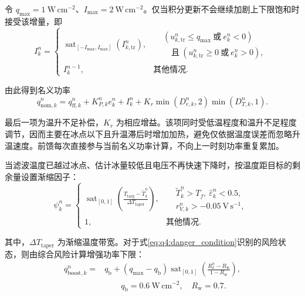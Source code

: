 \documentclass[bwprint]{gmcmthesis}
\numberwithin{equation}{section}
\numberwithin{figure}{section}
\begin{document}
令 $q_{\max}=1\ \mathrm{W\,cm^{-2}}$、$I_{\max}=2\ \mathrm{W\,cm^{-2}}$。仅当积分更新不会继续加剧上下限饱和时接受该增量，即
\begin{equation}
I_k^n=\begin{cases}
\operatorname{sat}_{[-I_{\max},I_{\max}]}(I_{k,\mathrm{tr}}^n),
& \begin{aligned}
&(u_{k,\mathrm{tr}}^n\leq q_{\max}\ \text{或}\ e_k^n<0)\\[-2pt]
&\quad\text{且}\ (u_{k,\mathrm{tr}}^n\geq0\ \text{或}\ e_k^n>0),
\end{aligned}\\
I_k^{n-1}, & \text{其他情况}.
\end{cases}
\label{eq:q4:antiwindup}
\end{equation}

由此得到名义功率
\begin{equation}
q_{\mathrm{nom},k}^n=q_{\mathrm{ff},k}^n+K_{P,k}^ne_k^n+I_k^n
+K_r\min(D_{r,k}^n,2)\min(D_{T,k}^n,1).
\label{eq:q4:nominal_power}
\end{equation}

最后一项为温升不足补偿，$K_r$ 为相应增益。该项同时受低温程度和温升不足程度调节，因而主要在冰点以下且升温滞后时增加加热，避免仅依据温度误差而忽略升温速度。前馈每次直接参与当前名义功率计算，不向上一时刻功率重复累加。

当滤波温度已越过冰点、估计冰量较低且电压不再快速下降时，按温度距目标的剩余量设置渐缩因子：
\begin{equation}
\psi_k^n=\begin{cases}
\displaystyle\operatorname{sat}_{[0,1]}\!\left(
\frac{T_{\mathrm{targ}}-\widetilde T_k^n}{\Delta T_{\mathrm{taper}}}\right),
&\begin{aligned}
&\widetilde T_k^n>T_f,\ \widehat\varepsilon_k^n<0.5,\\[-2pt]
&r_{V,k}^n>-0.05\ \mathrm{V\,s^{-1}},
\end{aligned}\\
1, &\text{其他情况}.
\end{cases}
\label{eq:q4:taper_factor}
\end{equation}

其中，$\Delta T_{\mathrm{taper}}$ 为渐缩温度带宽。对于式\eqref{eq:q4:danger_condition}识别的风险状态，则由综合风险计算增强功率下限：
\begin{equation}
\begin{aligned}
q_{\mathrm{boost},k}^n={}&q_{\mathrm b}
+(q_{\max}-q_{\mathrm b})\operatorname{sat}_{[0,1]}\!\left(
\frac{R_k^n-R_{\mathrm w}}{1-R_{\mathrm w}}\right),
\\
&\qquad q_{\mathrm b}=0.6\ \mathrm{W\,cm^{-2}},\quad R_{\mathrm w}=0.7.
\end{aligned}
\label{eq:q4:safety_boost}
\end{equation}
\end{document}
